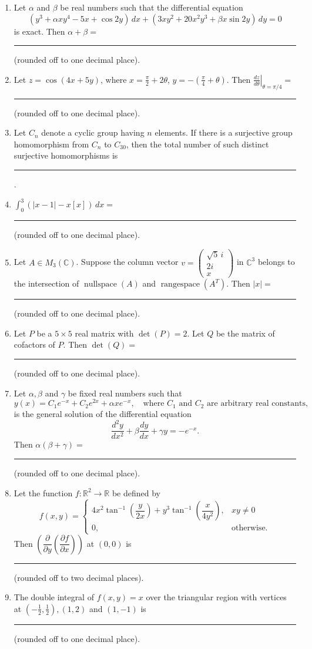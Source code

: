 \begin{enumerate}
\item Let $\alpha$ and $\beta$ be real numbers such that the differential equation
\[(y^3+\alpha xy^4-5x+\cos 2y)\,dx+(3xy^2+20x^2y^3+\beta x\sin 2y)\,dy=0\]
is exact. Then $\alpha+\beta=$ \rule{2cm}{0.4pt} (rounded off to one decimal place).
\item Let $z=\cos(4x+5y)$, where $x=\frac\pi2+2\theta$, $y=-\left(\frac\pi4+\theta\right)$. Then $\left.\frac{dz}{d\theta}\right|_{\theta=\pi/4}=$ \rule{2cm}{0.4pt} (rounded off to one decimal place).
\item Let $C_n$ denote a cyclic group having $n$ elements. If there is a surjective group homomorphism from $C_n$ to $C_{30}$, then the total number of such distinct surjective homomorphisms is \rule{2cm}{0.4pt}.
\item $\displaystyle\int_0^3(|x-1|-x[x])\,dx=$ \rule{2cm}{0.4pt} (rounded off to one decimal place).
\item Let $A\in M_3(\mathbb C)$. Suppose the column vector $v=\begin{pmatrix}\sqrt5\,i\\2i\\x\end{pmatrix}$ in $\mathbb C^3$ belongs to the intersection of $\operatorname{nullspace}(A)$ and $\operatorname{rangespace}(A^T)$. Then $|x|=$ \rule{2cm}{0.4pt} (rounded off to one decimal place).
\item Let $P$ be a $5\times5$ real matrix with $\det(P)=2$. Let $Q$ be the matrix of cofactors of $P$. Then $\det(Q)=$ \rule{2cm}{0.4pt} (rounded off to one decimal place).
\item Let $\alpha,\beta$ and $\gamma$ be fixed real numbers such that
\[y(x)=C_1e^{-x}+C_2e^{2x}+\alpha xe^{-x},\quad\text{where }C_1\text{ and }C_2\text{ are arbitrary real constants},\]
is the general solution of the differential equation
\[\frac{d^2y}{dx^2}+\beta\frac{dy}{dx}+\gamma y=-e^{-x}.\]
Then $\alpha(\beta+\gamma)=$ \rule{2cm}{0.4pt} (rounded off to one decimal place).
\item Let the function $f:\mathbb R^2\to\mathbb R$ be defined by
\[f(x,y)=\begin{cases}
4x^2\tan^{-1}\left(\dfrac{y}{2x}\right)+y^3\tan^{-1}\left(\dfrac{x}{4y^2}\right),&xy\ne0\\
0,&\text{otherwise}.
\end{cases}\]
Then $\left(\dfrac{\partial}{\partial y}\left(\dfrac{\partial f}{\partial x}\right)\right)$ at $(0,0)$ is \rule{2cm}{0.4pt} (rounded off to two decimal places).
\item The double integral of $f(x,y)=x$ over the triangular region with vertices at $\left(-\frac12,\frac12\right),(1,2)$ and $(1,-1)$ is \rule{2cm}{0.4pt} (rounded off to one decimal place).

\end{enumerate}
